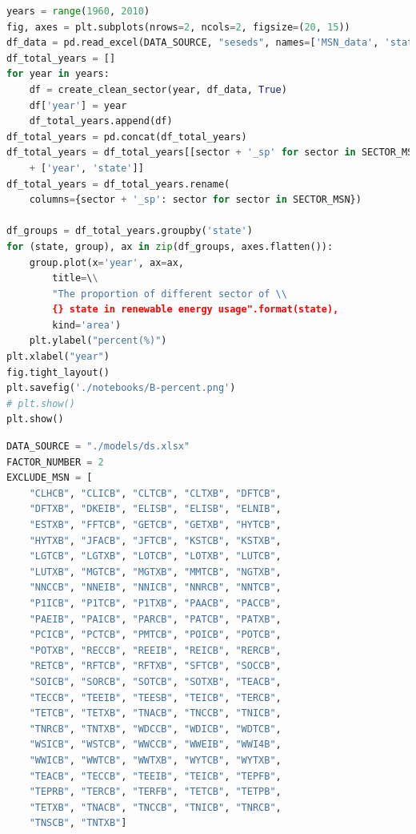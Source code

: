 \documentclass[a4paper,11pt]{article}
\begin{document}
\begin{appendices}
\begin{lstlisting}[language=Python, caption=sectorPercent.py]
years = range(1960, 2010)
fig, axes = plt.subplots(nrows=2, ncols=2, figsize=(20, 15))
df_data = pd.read_excel(DATA_SOURCE, "seseds", names=['MSN_data', 'state', 'year', 'data'])
df_total_years = []
for year in years:
    df = create_clean_sector(year, df_data, True)
    df['year'] = year
    df_total_years.append(df)
df_total_years = pd.concat(df_total_years)
df_total_years = df_total_years[[sector + '_sp' for sector in SECTOR_MSN] \\
    + ['year', 'state']]
df_total_years = df_total_years.rename(
    columns={sector + '_sp': sector for sector in SECTOR_MSN})

df_groups = df_total_years.groupby('state')
for (state, group), ax in zip(df_groups, axes.flatten()):
    group.plot(x='year', ax=ax,
        title=\\
        "The proportion of different sector of \\
        {} state in renewable energy usage".format(state),
        kind='area')
    plt.ylabel("percent(%)")
plt.xlabel("year")
fig.tight_layout()
plt.savefig('./notebooks/B-percent.png')
# plt.show()
plt.show()

\end{lstlisting}


\begin{lstlisting}[language=Python, caption=profile.py]
DATA_SOURCE = "./models/ds.xlsx"
FACTOR_NUMBER = 2
EXCLUDE_MSN = [
    "CLHCB", "CLICB", "CLTCB", "CLTXB", "DFTCB",
    "DFTXB", "DKEIB", "ELISB", "ELISB", "ELNIB", 
    "ESTXB", "FFTCB", "GETCB", "GETXB", "HYTCB",
    "HYTXB", "JFACB", "JFTCB", "KSTCB", "KSTXB", 
    "LGTCB", "LGTXB", "LOTCB", "LOTXB", "LUTCB", 
    "LUTXB", "MGTCB", "MGTXB", "MMTCB", "NGTXB", 
    "NNCCB", "NNEIB", "NNICB", "NNRCB", "NNTCB", 
    "P1ICB", "P1TCB", "P1TXB", "PAACB", "PACCB", 
    "PAEIB", "PAICB", "PARCB", "PATCB", "PATXB", 
    "PCICB", "PCTCB", "PMTCB", "POICB", "POTCB", 
    "POTXB", "RECCB", "REEIB", "REICB", "RERCB",
    "RETCB", "RFTCB", "RFTXB", "SFTCB", "SOCCB", 
    "SOICB", "SORCB", "SOTCB", "SOTXB", "TEACB", 
    "TECCB", "TEEIB", "TEESB", "TEICB", "TERCB", 
    "TETCB", "TETXB", "TNACB", "TNCCB", "TNICB", 
    "TNRCB", "TNTXB", "WDCCB", "WDICB", "WDTCB", 
    "WSICB", "WSTCB", "WWCCB", "WWEIB", "WWI4B", 
    "WWICB", "WWTCB", "WWTXB", "WYTCB", "WYTXB", 
    "TEACB", "TECCB", "TEEIB", "TEICB", "TEPFB", 
    "TEPRB", "TERCB", "TERFB", "TETCB", "TETPB", 
    "TETXB", "TNACB", "TNCCB", "TNICB", "TNRCB", 
    "TNSCB", "TNTXB"]


\end{lstlisting}
\end{appendices}
\end{document}
